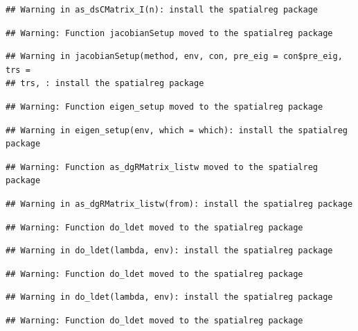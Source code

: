 \documentclass[11pt,]{article}
\begin{document}
\begin{verbatim}
## Warning in as_dsCMatrix_I(n): install the spatialreg package
\end{verbatim}

\begin{verbatim}
## Warning: Function jacobianSetup moved to the spatialreg package
\end{verbatim}

\begin{verbatim}
## Warning in jacobianSetup(method, env, con, pre_eig = con$pre_eig, trs =
## trs, : install the spatialreg package
\end{verbatim}

\begin{verbatim}
## Warning: Function eigen_setup moved to the spatialreg package
\end{verbatim}

\begin{verbatim}
## Warning in eigen_setup(env, which = which): install the spatialreg package
\end{verbatim}

\begin{verbatim}
## Warning: Function as_dgRMatrix_listw moved to the spatialreg package
\end{verbatim}

\begin{verbatim}
## Warning in as_dgRMatrix_listw(from): install the spatialreg package
\end{verbatim}

\begin{verbatim}
## Warning: Function do_ldet moved to the spatialreg package
\end{verbatim}

\begin{verbatim}
## Warning in do_ldet(lambda, env): install the spatialreg package
\end{verbatim}

\begin{verbatim}
## Warning: Function do_ldet moved to the spatialreg package
\end{verbatim}

\begin{verbatim}
## Warning in do_ldet(lambda, env): install the spatialreg package
\end{verbatim}

\begin{verbatim}
## Warning: Function do_ldet moved to the spatialreg package
\end{verbatim}
\end{document}
